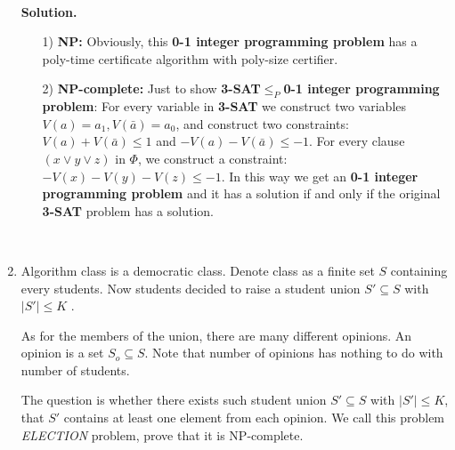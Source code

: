 \documentclass{article}
\newtheorem*{solution}{Solution}
\begin{document}
\begin{enumerate}
~\\
\textbf{Solution.}
\begin{itemize}
    \item [1)] \textbf{NP:} Obviously, this \textbf{0-1 integer programming problem} has a poly-time certificate algorithm with poly-size certifier.
    \item [2)] \textbf{NP-complete:} Just to show \textbf{3-SAT}$\leq_{P}$\textbf{0-1 integer programming problem}: For every variable in \textbf{3-SAT} we construct two variables $V(a)=a_1, V(\bar{a})=a_0$, and construct two constraints: $V(a)+V(\bar{a}) \leq 1$ and $-V(a)-V(\bar{a})\leq -1$. For every clause $(x\vee y\vee z)$ in $\Phi$, we construct a constraint: $-V(x)-V(y)-V(z)\leq -1$. In this way we get an \textbf{0-1 integer programming problem} and it has a solution if and only if the original \textbf{3-SAT} problem has a solution. 
\end{itemize}

~\\       
    \item
    Algorithm class is a democratic class. Denote class as a finite set $S$ containing every students. Now students decided to raise a student union $S' \subseteq S$ with $|S'|\leq K$ .
	
	As for the members of the union, there are many different opinions. An opinion is a set $S_o\subseteq S$. Note that number of opinions has nothing to do with number of students.
	
	The question is whether there exists such student union $S' \subseteq S$ with $|S'|\leq K$, that $S'$ contains at least one element from each opinion. We call this problem \emph{ELECTION} problem, prove that it is NP-complete.
    


\end{enumerate}
\end{document}

